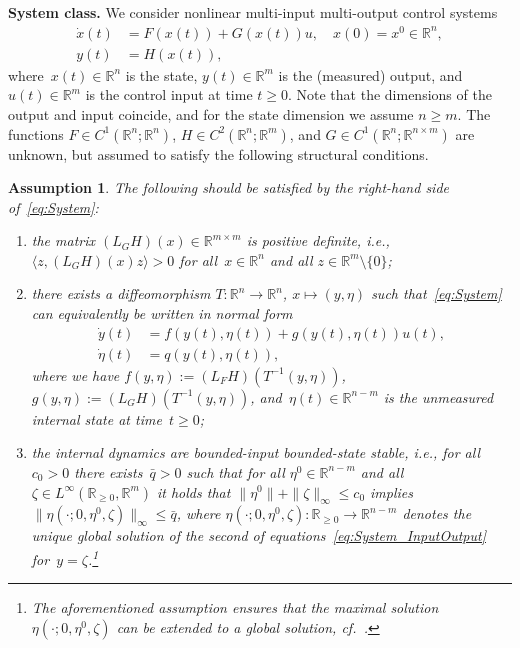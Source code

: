 \documentclass[journal,twoside,web]{ieeeconf}
\newcommand{\R}{\mathbb{R}}
\newtheorem{ass}{Assumption}
\begin{document}
{\textbf{System class.}}
We consider nonlinear multi-input multi-output control systems
\begin{equation} \label{eq:System}
\begin{aligned}
    \dot x(t) &= F(x(t)) + G(x(t))u , \quad x(0) = x^0 \in \R^n, \\
    y(t) &= H(x(t)),
\end{aligned}
\end{equation}
where~$x(t) \in \R^n$ is the state, $y(t) \in \R^m$ is the (measured) output, and $u(t) \in \R^m$ is the control input at time ${t\geq 0}$.
Note that the dimensions of the output and input coincide, and for the state dimension we assume $n \ge m$.
The functions $F \in C^1(\R^n;\R^n)$, $H\in C^2(\R^n;\R^m)$, and $G \in C^1(\R^n; \R^{n \times m})$ are unknown, but assumed to satisfy the following structural conditions.
%
\begin{ass} \label{ass:StructuralAssumptions}
The following should be satisfied by the right-hand side of~\eqref{eq:System}:
    \begin{enumerate}
        \item[a)] the matrix $(L_G H)(x) \in \R^{m \times m}$ is positive definite, i.e., $\langle z,  (L_GH)(x) z \rangle > 0$ for all~$x \in \R^n$ and all ${z \in \R^m \setminus \{0\}}$; 
        \item[b)] there exists a diffeomorphism $T: \R^n \to \R^n$, $x \mapsto (y,\eta)$ such that~\eqref{eq:System} can equivalently be written in normal form
        \begin{equation} \label{eq:System_InputOutput}
            \begin{aligned}
                \dot y(t) &= f(y(t),\eta(t)) + g(y(t),\eta(t)) u(t), \\
             \dot \eta(t) & = q(y(t),\eta(t)),
            \end{aligned}
            \end{equation}
            where we have $f(y,\eta) := (L_F H)(T^{-1}(y,\eta))$, $g(y,\eta) := (L_G H)(T^{-1}(y,\eta))$, and~$\eta(t) \in \R^{n-m}$ is the unmeasured internal state at time~$t \ge 0$;
        \item[c)] the internal dynamics are bounded-input bounded-state stable, i.e., for all~$c_0 > 0$ there exists~$\bar q > 0$ such that for all $\eta^0 \in \R^{n-m}$ and all $\zeta\in L^\infty(\R_{\ge 0},\R^{m})$ it holds that $\|\eta^0\|+ \|\zeta\|_\infty  \leq c_0$ implies ${\|\eta (\cdot;0,\eta^0,\zeta)\|_\infty \leq \bar q}$, where $\eta (\cdot;0,\eta^0,\zeta):\R_{\ge 0}\to\R^{n-m}$ denotes the unique global solution of the second of equations~\eqref{eq:System_InputOutput} for~${y=\zeta}$.\footnote{The aforementioned assumption ensures that the maximal solution $\eta (\cdot;0,\eta^0,\zeta)$ can be extended to a global solution, cf.~\cite[\S~10, Thm.~XX]{Walt98}.}
    \end{enumerate}
\end{ass}
\end{document}
